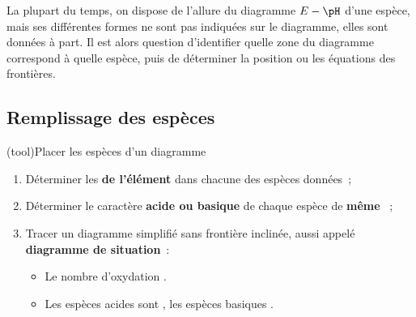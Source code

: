 \documentclass[a4paper, 10pt, landscape, twocolumn]{book}
\begin{document}
La plupart du temps, on dispose de l'allure du diagramme $E-\pH$ d'une espèce,
mais ses différentes formes ne sont pas indiquées sur le diagramme, elles sont
données à part. Il est alors question d'identifier quelle zone du diagramme
correspond à quelle espèce, puis de déterminer la position ou les équations des
frontières.

\subsection{Remplissage des espèces}

\begin{tcb*}(tool){Placer les espèces d'un diagramme}
	\begin{enumerate}[label=\sqenumi]
		\item Déterminer les \textbf{\no de l'élément} dans chacune des espèces
		      données~;
		\item Déterminer le caractère \textbf{acide ou basique} de chaque espèce de
		      \textbf{même \no}~;
		\item Tracer un diagramme simplifié sans frontière inclinée, aussi appelé
		      \textbf{diagramme de situation}~:
		      \begin{itemize}[label=$\scaleto{\triangleright}{7pt}$]
			      \item Le nombre d'oxydation .
			      \item Les espèces acides sont , les espèces basiques
			            .
		      \end{itemize}
	\end{enumerate}
\end{tcb*}
\end{document}
